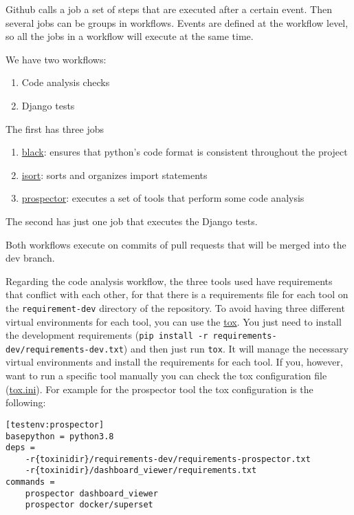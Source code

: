 \documentclass[
]{book}
\providecommand{\tightlist}{%
  \setlength{\itemsep}{0pt}\setlength{\parskip}{0pt}}
\begin{document}
Github calls a job a set of steps that are executed after a certain event.
Then several jobs can be groups in workflows.
Events are defined at the workflow level, so all the jobs in a workflow will execute at the same time.

We have two workflows:

\begin{enumerate}
\def\labelenumi{\arabic{enumi}.}
\tightlist
\item
  Code analysis checks
\item
  Django tests
\end{enumerate}

The first has three jobs

\begin{enumerate}
\def\labelenumi{\arabic{enumi}.}
\tightlist
\item
  \href{https://github.com/psf/black}{black}: ensures that python's code format is consistent throughout the project
\item
  \href{https://github.com/PyCQA/isort}{isort}: sorts and organizes import statements
\item
  \href{https://github.com/PyCQA/prospector}{prospector}: executes a set of tools that perform some code analysis
\end{enumerate}

The second has just one job that executes the Django tests.

Both workflows execute on commits of pull requests that will be merged into the dev branch.

Regarding the code analysis workflow, the three tools used have requirements that conflict with each other, for that there is a requirements file for each tool on the \texttt{requirement-dev} directory of the repository.
To avoid having three different virtual environments for each tool, you can use the \href{https://tox.readthedocs.io/}{tox}.
You just need to install the development requirements (\texttt{pip\ install\ -r\ requirements-dev/requirements-dev.txt}) and then just run \texttt{tox}.
It will manage the necessary virtual environments and install the requirements for each tool.
If you, however, want to run a specific tool manually you can check the tox configuration file (\href{https://github.com/EHDEN/NetworkDashboards/blob/master/tox.ini}{tox.ini}).
For example for the prospector tool the tox configuration is the following:

\begin{verbatim}
[testenv:prospector]
basepython = python3.8
deps =
    -r{toxinidir}/requirements-dev/requirements-prospector.txt
    -r{toxinidir}/dashboard_viewer/requirements.txt
commands =
    prospector dashboard_viewer
    prospector docker/superset
\end{verbatim}
\end{document}
